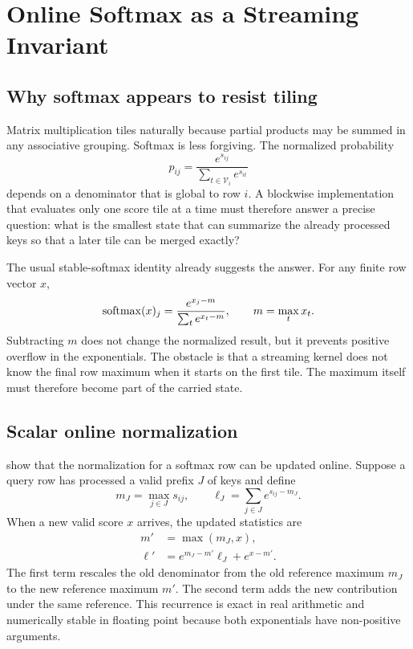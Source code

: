 \chapter{Online Softmax as a Streaming Invariant}
\label{chap:online-softmax}

\section{Why softmax appears to resist tiling}

Matrix multiplication tiles naturally because partial products may be summed in any associative grouping. Softmax is less forgiving. The normalized probability
\begin{equation}
  p_{ij} = \frac{e^{s_{ij}}}{\sum_{t\in\mathcal V_i} e^{s_{it}}}
\end{equation}
depends on a denominator that is global to row $i$. A blockwise implementation that evaluates only one score tile at a time must therefore answer a precise question: what is the smallest state that can summarize the already processed keys so that a later tile can be merged exactly?

The usual stable-softmax identity already suggests the answer. For any finite row vector $x$,
\begin{equation}
  \operatorname{softmax}(x)_j
  = \frac{e^{x_j-m}}{\sum_t e^{x_t-m}},
  \qquad
  m = \max_t x_t.
  \label{eq:stable-softmax}
\end{equation}
Subtracting $m$ does not change the normalized result, but it prevents positive overflow in the exponentials. The obstacle is that a streaming kernel does not know the final row maximum when it starts on the first tile. The maximum itself must therefore become part of the carried state.

\section{Scalar online normalization}

\citet{milakov2018online} show that the normalization for a softmax row can be updated online. Suppose a query row has processed a valid prefix $J$ of keys and define
\begin{equation}
  m_J = \max_{j\in J} s_{ij},
  \qquad
  \ell_J = \sum_{j\in J} e^{s_{ij}-m_J}.
\end{equation}
When a new valid score $x$ arrives, the updated statistics are
\begin{align}
  m' &= \max(m_J, x), \\
  \ell' &= e^{m_J-m'} \ell_J + e^{x-m'}.
  \label{eq:scalar-online}
\end{align}
The first term rescales the old denominator from the old reference maximum $m_J$ to the new reference maximum $m'$. The second term adds the new contribution under the same reference. This recurrence is exact in real arithmetic and numerically stable in floating point because both exponentials have non-positive arguments.

